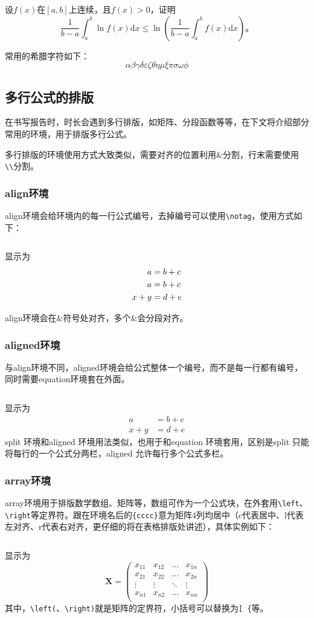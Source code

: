 设$f(x)$在$[a,b]$上连续，且$f(x)>0$，证明
\begin{equation}
\frac{1}{b-a}\int_{a}^{b}\ln f(x)\text{d}x\leqslant \ln \left(\frac{1}{b-a}\int_{a}^{b}f(x)\text{d}x\right)\text{。}
\end{equation}

常用的希腊字符如下：
\[\alpha \beta \gamma \delta \varepsilon \zeta \theta \eta \mu \xi \pi \sigma \omega \phi\]
\subsection{多行公式的排版}
在书写报告时，时长会遇到多行排版，如矩阵、分段函数等等，在下文将介绍部分常用的环境，用于排版多行公式。

多行排版的环境使用方式大致类似，需要对齐的位置利用$\&$分割，行末需要使用\verb|\\|分割。
\subsubsection{align环境}
align环境会给环境内的每一行公式编号，去掉编号可以使用\verb|\notag|，使用方式如下：
\inputminted[linenos,frame=lines]{latex}{code/align.tex}
显示为
\begin{align}
a & = b + c \\
a & = b + c \\
x + y & = d + e \notag
\end{align}

align环境会在$\&$符号处对齐，多个$\&$会分段对齐。
\subsubsection{aligned环境}
与align环境不同，aligned环境会给公式整体一个编号，而不是每一行都有编号，同时需要equation环境套在外面。
\inputminted[linenos,frame=lines]{latex}{code/aligned.tex}
显示为
\begin{equation}
	\begin{aligned}
		a & = b + c \\
		x + y & = d + e 
	\end{aligned}
\end{equation}
split 环境和aligned 环境用法类似，也用于和equation 环境套用，区别是split 只能
将每行的一个公式分两栏，aligned 允许每行多个公式多栏。
\subsubsection{array环境}
array环境用于排版数学数组、矩阵等，数组可作为一个公式块，在外套用\verb|\left|、\verb|\right|等定界符。跟在环境名后的\verb|{cccc}|意为矩阵4列均居中（c代表居中、l代表左对齐、r代表右对齐，更仔细的将在表格排版处讲述），具体实例如下：
\inputminted[linenos,frame=lines]{latex}{code/array.tex}
显示为
\[ 
\mathbf{X} = \left(
\begin{array}{cccc}
x_{11} & x_{12} & \ldots & x_{1n}\\
x_{21} & x_{22} & \ldots & x_{2n}\\
\vdots & \vdots & \ddots & \vdots\\
x_{n1} & x_{n2} & \ldots & x_{nn}\\
\end{array} \right) 
\]
其中，\verb|\left(|、\verb|\right)|就是矩阵的定界符，小括号可以替换为\verb|[ {|等。
